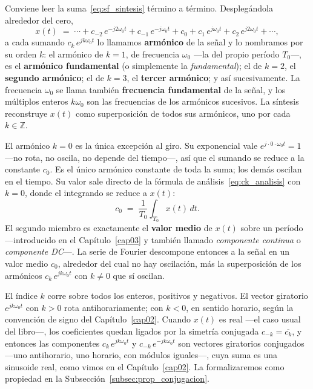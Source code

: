 \documentclass[class=book, crop=false]{standalone}
\begin{document}
Conviene leer la suma~\eqref{eq:sf_sintesis} término a término.
Desplegándola alrededor del cero,
\begin{equation*}
    x(t) \;=\; \cdots
            + c_{-2}\,e^{-j 2\omega_0 t}
            + c_{-1}\,e^{-j\omega_0 t}
            + c_{0}
            + c_{1}\,e^{j\omega_0 t}
            + c_{2}\,e^{j 2\omega_0 t}
            + \cdots,
\end{equation*}
a cada sumando $c_k\,e^{jk\omega_0 t}$ lo llamamos
\textbf{armónico} de la señal y lo nombramos por su orden $k$:
el armónico de $k=1$, de frecuencia $\omega_0$ ---la del propio
período $T_0$---, es el \textbf{armónico fundamental} (o
simplemente la \emph{fundamental}); el de $k=2$, el
\textbf{segundo armónico}; el de $k=3$, el \textbf{tercer
armónico}; y así sucesivamente. La frecuencia $\omega_0$ se
llama también \textbf{frecuencia fundamental} de la señal, y los
múltiplos enteros $k\omega_0$ son las frecuencias de los
armónicos sucesivos. La síntesis reconstruye $x(t)$ como
superposición de todos sus armónicos, uno por cada
$k\in\mathbb{Z}$.

El armónico $k=0$ es la única excepción al giro. Su exponencial
vale $e^{j\cdot 0\cdot \omega_0 t} = 1$ ---no rota, no oscila,
no depende del tiempo---, así que el sumando se reduce a la
constante $c_0$. Es el único armónico constante de toda la
suma; los demás oscilan en el tiempo. Su valor sale directo de
la fórmula de análisis~\eqref{eq:ck_analisis} con $k=0$, donde
el integrando se reduce a $x(t)$:
\begin{equation*}
    c_0 \;=\; \frac{1}{T_0}\int_{T_0} x(t)\,dt.
\end{equation*}
El segundo miembro es exactamente el \textbf{valor medio} de
$x(t)$ sobre un período ---introducido en el
Capítulo~\ref{cap03} y también llamado \emph{componente
continua} o \emph{componente DC}---. La serie de Fourier
descompone entonces a la señal en un valor medio $c_0$,
alrededor del cual no hay oscilación, más la superposición de
los armónicos $c_k\,e^{jk\omega_0 t}$ con $k\neq 0$ que sí
oscilan.

El índice $k$ corre sobre todos los enteros, positivos y
negativos. El vector giratorio $e^{jk\omega_0 t}$ con $k > 0$
rota antihorariamente; con $k < 0$, en sentido horario, según
la convención de signo del Capítulo~\ref{cap02}. Cuando $x(t)$
es real ---el caso usual del libro---, los coeficientes quedan
ligados por la simetría conjugada $c_{-k} = \overline{c_k}$, y
entonces las componentes $c_k\,e^{jk\omega_0 t}$ y
$c_{-k}\,e^{-jk\omega_0 t}$ son vectores giratorios conjugados
---uno antihorario, uno horario, con módulos iguales---, cuya
suma es una sinusoide real, como vimos en el
Capítulo~\ref{cap02}. La formalizaremos como propiedad en la
Subsección~\ref{subsec:prop_conjugacion}.
\end{document}
